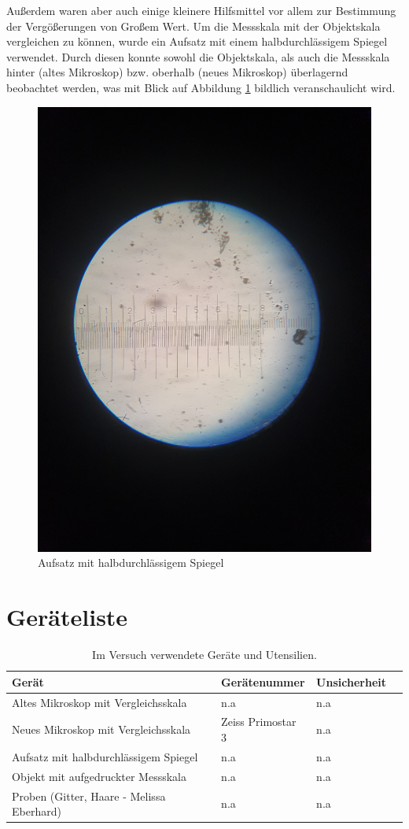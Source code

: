 \documentclass[12pt,a4paper,twoside]{article}
\begin{document}
    \noindent
    Außerdem waren aber auch einige kleinere Hilfsmittel vor allem zur Bestimmung der Vergößerungen von Großem Wert. 
    Um die Messskala mit der Objektskala vergleichen zu können, wurde ein Aufsatz mit einem halbdurchlässigem Spiegel verwendet. 
    Durch diesen konnte sowohl die Objektskala, als auch die Messskala hinter (altes Mikroskop) bzw. oberhalb (neues Mikroskop) überlagernd beobachtet werden, was mit Blick auf Abbildung \ref*{fig:Aufsatz} bildlich veranschaulicht wird.

    \begin{figure}[H]
        \centering
        \includegraphics[width=0.5\linewidth, angle=0]{nudes/Aufsatz.jpg}
        \caption{Aufsatz mit halbdurchlässigem Spiegel}
        \label{fig:Aufsatz}
    \end{figure}        


\section{Geräteliste} %

    \begin{table}[H]
        \centering
        \caption{Im Versuch verwendete Geräte und Utensilien.}
        \label{tab:geraete}
        \begin{tabular}{| l | l | l | l |}
            \hline
            Gerät & Gerätenummer  & Unsicherheit \\
            \hline
            Altes Mikroskop mit Vergleichsskala & {n.a} & {n.a} \\
            Neues Mikroskop mit Vergleichsskala & Zeiss Primostar 3 & {n.a} \\
            Aufsatz mit halbdurchlässigem Spiegel & {n.a} & {n.a} \\
            Objekt mit aufgedruckter Messskala & {n.a} & {n.a} \\
            Proben (Gitter, Haare - Melissa Eberhard) & {n.a} & {n.a} \\
            \hline
        \end{tabular}
    \end{table}
\end{document}
